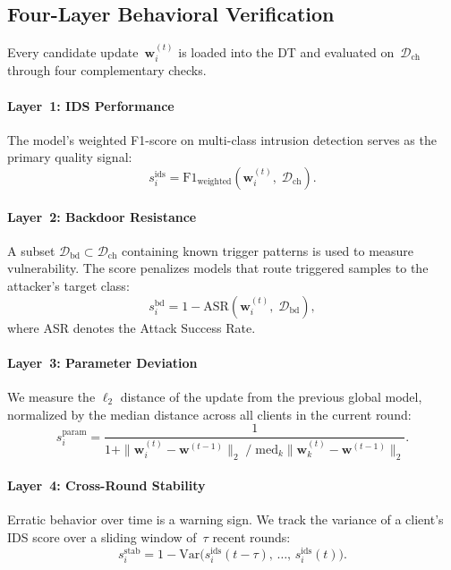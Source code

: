\documentclass[conference]{IEEEtran}
\begin{document}
    \subsection{Four-Layer Behavioral Verification}\label{sec:fourlayer}
    
    Every candidate update~$\mathbf{w}_i^{(t)}$ is loaded into the DT and evaluated on~$\mathcal{D}_{\text{ch}}$ through four complementary checks.
    
    \paragraph{Layer~1: IDS Performance} The model's weighted F1-score on multi-class intrusion detection serves as the primary quality signal:
    \begin{equation}
        s_i^{\text{ids}} = \text{F1}_{\text{weighted}}(\mathbf{w}_i^{(t)},\; \mathcal{D}_{\text{ch}}).
    \label{eq:ids}
    \end{equation}
    
    \paragraph{Layer~2: Backdoor Resistance} A subset $\mathcal{D}_{\text{bd}} \subset \mathcal{D}_{\text{ch}}$ containing known trigger patterns is used to measure vulnerability. The score penalizes models that route triggered samples to the attacker's target class:
    \begin{equation}
        s_i^{\text{bd}} = 1 - \text{ASR}(\mathbf{w}_i^{(t)},\; \mathcal{D}_{\text{bd}}),
    \label{eq:bd}
    \end{equation}
    where ASR denotes the Attack Success Rate.
    
    \paragraph{Layer~3: Parameter Deviation} We measure the $\ell_2$ distance of the update from the previous global model, normalized by the median distance across all clients in the current round:
    \begin{equation}
        s_i^{\text{param}} = \frac{1}{1 + \|\mathbf{w}_i^{(t)} - \mathbf{w}^{(t-1)}\|_2 \;/\; \mathrm{med}_k \|\mathbf{w}_k^{(t)} - \mathbf{w}^{(t-1)}\|_2}.
    \label{eq:param}
    \end{equation}
    
    \paragraph{Layer~4: Cross-Round Stability} Erratic behavior over time is a warning sign. We track the variance of a client's IDS score over a sliding window of~$\tau$ recent rounds:
    \begin{equation}
        s_i^{\text{stab}} = 1 - \mathrm{Var}\!\bigl(s_i^{\text{ids}}(t{-}\tau),\, \dots,\, s_i^{\text{ids}}(t)\bigr).
    \label{eq:stab}
    \end{equation}
    
\end{document}

